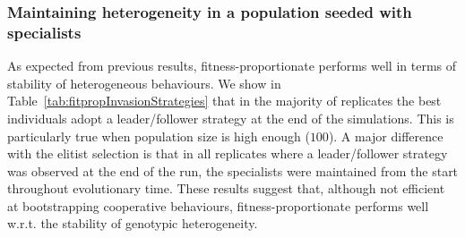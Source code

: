     \subsubsection{Maintaining heterogeneity in a population seeded with specialists}
      \begin{table}[hbtp]
        \caption{\textbf{Strategies evolved by the best individuals with fitness-proportionate selection when adding \emph{followers}.} Repartition of the different strategies adopted by the best individuals at the last evaluation in each of the replicates for different population sizes \(N\). We indicate in each cell the number of simulations where a particular strategy evolved. Populations were evolved under a fitness-proportionate selection. The population was initially seeded with a population of \emph{solo} individuals in which we added a specific amount of \emph{followers}. In the table "L/F" stands for leader/follower and "NC" for "Non-Cooperative".}
        \label{tab:fitpropInvasionStrategies}
      \end{table}

      As expected from previous results, fitness-proportionate performs well in terms of stability of heterogeneous behaviours. We show in Table~\ref{tab:fitpropInvasionStrategies} that in the majority of replicates the best individuals adopt a leader/follower strategy at the end of the simulations. This is particularly true when population size is high enough ($100$). A major difference with the elitist selection is that in all replicates where a leader/follower strategy was observed at the end of the run, the specialists were maintained from the start throughout evolutionary time. These results suggest that, although not efficient at bootstrapping cooperative behaviours, fitness-proportionate performs well w.r.t. the stability of genotypic heterogeneity.



